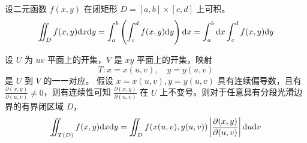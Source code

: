 \documentclass{ctexbook}
\def\diff{\textnormal{d}}
\begin{document}
\begin{theorem}[矩形区域上的二重积分]
    设二元函数 $f(x,y)$ 在闭矩形 $D=[a,b]\times[c,d]$ 上可积。
    \begin{equation}
        \iint_D f(x,y)\diff x\diff y=\int_a^b\left(\int_c^d f(x,y)\diff y\right)\diff x=\int_a^b\diff x\int_c^d f(x,y)\diff y
    \end{equation}
\end{theorem}

\begin{theorem}[二重积分变量代换公式]
    设 $U$ 为 $uv$ 平面上的开集，$V$ 是 $xy$ 平面上的开集，映射
    \begin{equation}
        T: x=x(u,v),\quad y=y(u,v)
    \end{equation}
    是 $U$ 到 $V$ 的一一对应。
    假设 $x=x(u,v),y=y(u,v)$ 具有连续偏导数，且有 $\frac{\partial (x,y)}{\partial (u,v)}\neq 0$，则有连续性可知 $\frac{\partial (x,y)}{\partial(u,v)}$ 在 $U$ 上不变号。则对于任意具有分段光滑边界的有界闭区域 $D$，
    \begin{equation}
        \iint_{T(D)}f(x,y)\diff x\diff y=\iint_D f(x(u,v),y(u,v))\left|\frac{\partial(x,y)}{\partial(u,v)}\right|\diff u\diff v
    \end{equation}
\end{theorem}
\end{document}
